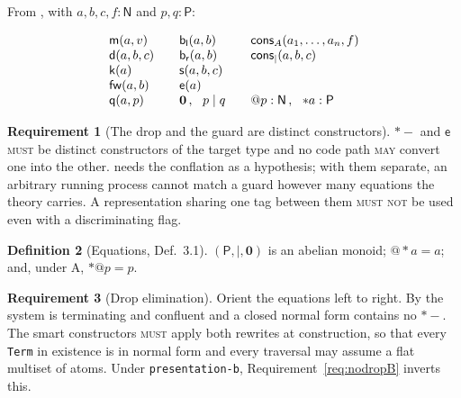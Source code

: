 \documentclass[11pt,a4paper]{article}
\makeatletter
\newcommand{\code}[1]{\texttt{#1}}
\newcommand{\MUST}{\textsc{must}}
\newcommand{\MUSTNOT}{\textsc{must not}}
\newcommand{\MAY}{\textsc{may}}
\newcommand{\quo}[1]{@#1}
\newcommand{\drp}[1]{{*}#1}
\newcommand{\nil}{\mathbf{0}}
\newcommand{\Nsort}{\mathsf{N}}
\newcommand{\Psort}{\mathsf{P}}
\newcommand{\mm}{\mathsf{m}}
\newcommand{\dd}{\mathsf{d}}
\newcommand{\kk}{\mathsf{k}}
\newcommand{\fw}{\mathsf{fw}}
\newcommand{\bl}{\mathsf{b}_{\mathsf{l}}}
\newcommand{\br}{\mathsf{b}_{\mathsf{r}}}
\newcommand{\sy}{\mathsf{s}}
\newcommand{\ev}{\mathsf{e}}
\newcommand{\qq}{\mathsf{q}}
\newcommand{\cons}{\mathsf{cons}}
\theoremstyle{definition}
\newtheorem{definition}{Definition}[section]
\newtheorem{requirement}[definition]{Requirement}
\theoremstyle{plain}
\makeatother
\begin{document}
From \cite[\S3.2]{draft3}, with $a,b,c,f : \Nsort$ and $p,q : \Psort$:

\[
\begin{array}{l@{\qquad}l@{\qquad}l}
 \mm(a,v) & \bl(a,b) & \cons_{A}(a_{1},\dots,a_{n},f)\\
 \dd(a,b,c) & \br(a,b) & \cons_{\mid}(a,b,c)\\
 \kk(a) & \sy(a,b,c) & \\
 \fw(a,b) & \ev(a) & \\
 \qq(a,p) & \nil \,,\ \ p \mid q & \quo{p} : \Nsort \,,\ \ \drp{a} : \Psort
\end{array}
\]

\begin{requirement}[The drop and the guard are distinct constructors]
\label{req:noconflation}
$\drp{-}$ and $\ev$ \MUST{} be distinct constructors of the target type and no
code path \MAY{} convert one into the other. \cite[Prop.~3.5]{draft3} needs
the conflation as a hypothesis; with them separate, an arbitrary running
process cannot match a guard however many equations the theory carries. A
representation sharing one tag between them \MUSTNOT{} be used even with a
discriminating flag.
\end{requirement}

\begin{definition}[Equations, \cite{draft3} Def.~3.1]\label{def:teqns}
$(\Psort,\mid,\nil)$ is an abelian monoid; $\quo{\drp{a}} = a$; and, under A,
$\drp{\quo{p}} = p$.
\end{definition}

\begin{requirement}[Drop elimination]\label{req:dropelim}
Orient the equations left to right. By \cite[Lem.~2.8]{logic} the system is
terminating and confluent and a closed normal form contains no $\drp{-}$. The
smart constructors \MUST{} apply both rewrites at construction, so that every
\code{Term} in existence is in normal form and every traversal may assume a
flat multiset of atoms. Under \code{presentation-b},
Requirement~\ref{req:nodropB} inverts this.
\end{requirement}
\end{document}

